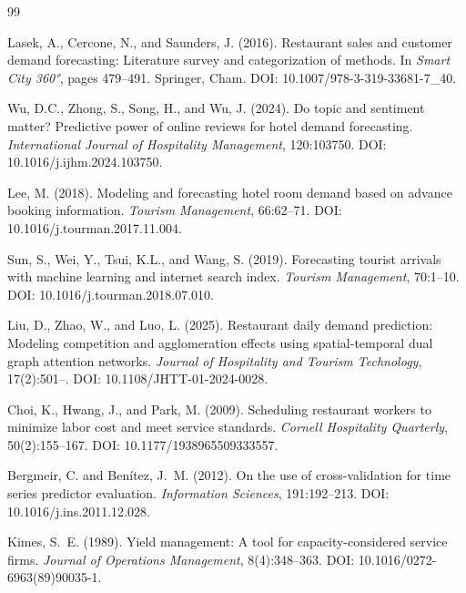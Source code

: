 \documentclass[12pt,a4paper,oneside]{article}
\begin{document}
\begin{thebibliography}{99}

Lasek, A., Cercone, N., and Saunders, J. (2016).
\newblock Restaurant sales and customer demand forecasting: Literature survey and categorization of methods.
\newblock In \textit{Smart City 360°}, pages 479--491. Springer, Cham.
\newblock DOI: 10.1007/978-3-319-33681-7\_40.

Wu, D.C., Zhong, S., Song, H., and Wu, J. (2024).
\newblock Do topic and sentiment matter? Predictive power of online reviews for hotel demand forecasting.
\newblock \textit{International Journal of Hospitality Management}, 120:103750.
\newblock DOI: 10.1016/j.ijhm.2024.103750.

Lee, M. (2018).
\newblock Modeling and forecasting hotel room demand based on advance booking information.
\newblock \textit{Tourism Management}, 66:62--71.
\newblock DOI: 10.1016/j.tourman.2017.11.004.

Sun, S., Wei, Y., Tsui, K.L., and Wang, S. (2019).
\newblock Forecasting tourist arrivals with machine learning and internet search index.
\newblock \textit{Tourism Management}, 70:1--10.
\newblock DOI: 10.1016/j.tourman.2018.07.010.

Liu, D., Zhao, W., and Luo, L. (2025).
\newblock Restaurant daily demand prediction: Modeling competition and agglomeration effects using spatial-temporal dual graph attention networks.
\newblock \textit{Journal of Hospitality and Tourism Technology}, 17(2):501--.
\newblock DOI: 10.1108/JHTT-01-2024-0028.

Choi, K., Hwang, J., and Park, M. (2009).
\newblock Scheduling restaurant workers to minimize labor cost and meet service standards.
\newblock \textit{Cornell Hospitality Quarterly}, 50(2):155--167.
\newblock DOI: 10.1177/1938965509333557.

Bergmeir, C. and Ben{\'i}tez, J.~M. (2012).
\newblock On the use of cross-validation for time series predictor evaluation.
\newblock \textit{Information Sciences}, 191:192--213.
\newblock DOI: 10.1016/j.ins.2011.12.028.

Kimes, S.~E. (1989).
\newblock Yield management: A tool for capacity-considered service firms.
\newblock \textit{Journal of Operations Management}, 8(4):348--363.
\newblock DOI: 10.1016/0272-6963(89)90035-1.


\end{thebibliography}
\end{document}
